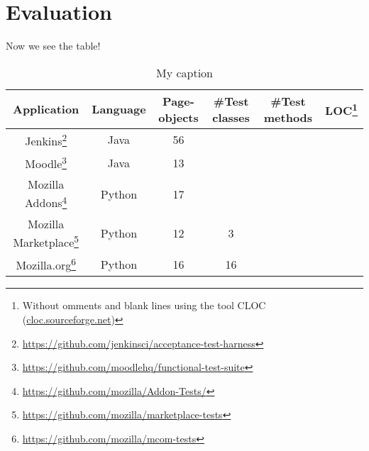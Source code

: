 \chapter{Evaluation} %

\label{Chapter6} %

Now we see the table!

\begin{savenotes}
\begin{table}[h!]
\centering
\begin{tabular}{|c|c|c|c|c|c|}
\hline
Application&  Language&  Page-objects&  \#Test classes&  \#Test methods&  LOC\footnote{Without omments and blank lines using the tool CLOC (\url{cloc.sourceforge.net})}  \\
\hline
 Jenkins\footnote{\url{https://github.com/jenkinsci/acceptance-test-harness}}&  Java&56&  &  &    \\
\hline
Moodle\footnote{\url{https://github.com/moodlehq/functional-test-suite}}&  Java&  13&  &  &    \\
\hline
Mozilla Addons\footnote{\url{https://github.com/mozilla/Addon-Tests/}} &  Python&  17&  &  &    \\
\hline
Mozilla Marketplace\footnote{\url{https://github.com/mozilla/marketplace-tests}} &  Python&  12&  3&  &  \\
\hline
Mozilla.org\footnote{\url{https://github.com/mozilla/mcom-tests}} &  Python&  16&  16&  &   \\
\hline
\end{tabular}
\caption{My caption}
\label{my-label}
\end{table}
\end{savenotes}